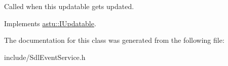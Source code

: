 Called when this updatable gets updated. 

Implements \hyperlink{classastu_1_1IUpdatable_a76c7c6e2a71b725bbdbdf6808ef4743f}{astu\+::\+I\+Updatable}.



The documentation for this class was generated from the following file\+:\begin{DoxyCompactItemize}
\item 
include/Sdl\+Event\+Service.\+h\end{DoxyCompactItemize}
